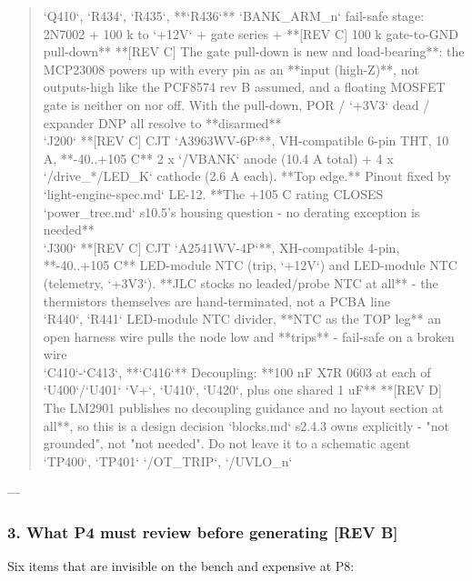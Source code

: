 \documentclass[11pt,a4paper]{article}
\begin{document}
\begin{quote}
\textbar{} `Q410`, `R434`, `R435`, {*}{*}`R436`{*}{*} \textbar{} `BANK\_ARM\_n` fail-safe stage: 2N7002 + 100 k to `+12V` + gate series + {*}{*}{[}REV C{]} 100 k gate-to-GND pull-down{*}{*} \textbar{} {*}{*}{[}REV C{]} The gate pull-down is new and load-bearing{*}{*}: the MCP23008 powers up with every pin as an {*}{*}input (high-Z){*}{*}, not outputs-high like the PCF8574 rev B assumed, and a floating MOSFET gate is neither on nor off. With the pull-down, POR / `+3V3` dead / expander DNP all resolve to {*}{*}disarmed{*}{*} \textbar{}\\
\textbar{} `J200` \textbar{} {*}{*}{[}REV C{]} CJT `A3963WV-6P`{*}{*}, VH-compatible 6-pin THT, 10 A, {*}{*}-40..+105 C{*}{*} \textbar{} 2 x `/VBANK` anode (10.4 A total) + 4 x `/drive\_{*}/LED\_K` cathode (2.6 A each). {*}{*}Top edge.{*}{*} Pinout fixed by `light-engine-spec.md` LE-12. {*}{*}The +105 C rating CLOSES `power\_tree.md` s10.5's housing question - no derating exception is needed{*}{*} \textbar{}\\
\textbar{} `J300` \textbar{} {*}{*}{[}REV C{]} CJT `A2541WV-4P`{*}{*}, XH-compatible 4-pin, {*}{*}-40..+105 C{*}{*} \textbar{} LED-module NTC (trip, `+12V`) and LED-module NTC (telemetry, `+3V3`). {*}{*}JLC stocks no leaded/probe NTC at all{*}{*} - the thermistors themselves are hand-terminated, not a PCBA line \textbar{}\\
\textbar{} `R440`, `R441` \textbar{} LED-module NTC divider, {*}{*}NTC as the TOP leg{*}{*} \textbar{} an open harness wire pulls the node low and {*}{*}trips{*}{*} - fail-safe on a broken wire \textbar{}\\
\textbar{} `C410`-`C413`, {*}{*}`C416`{*}{*} \textbar{} Decoupling: {*}{*}100 nF X7R 0603 at each of `U400`/`U401` `V+`, `U410`, `U420`, plus one shared 1 uF{*}{*} \textbar{} {*}{*}{[}REV D{]} The LM2901 publishes no decoupling guidance and no layout section at all{*}{*}, so this is a design decision `blocks.md` s2.4.3 owns explicitly - "not grounded", not "not needed". Do not leave it to a schematic agent \textbar{}\\
\textbar{} `TP400`, `TP401` \textbar{} `/OT\_TRIP`, `/UVLO\_n` \textbar{} \textbar{}
\end{quote}
---

\subsubsection*{3. What P4 must review before generating  \textbf{{[}REV B{]}}}
Six items that are invisible on the bench and expensive at P8:
\end{document}
